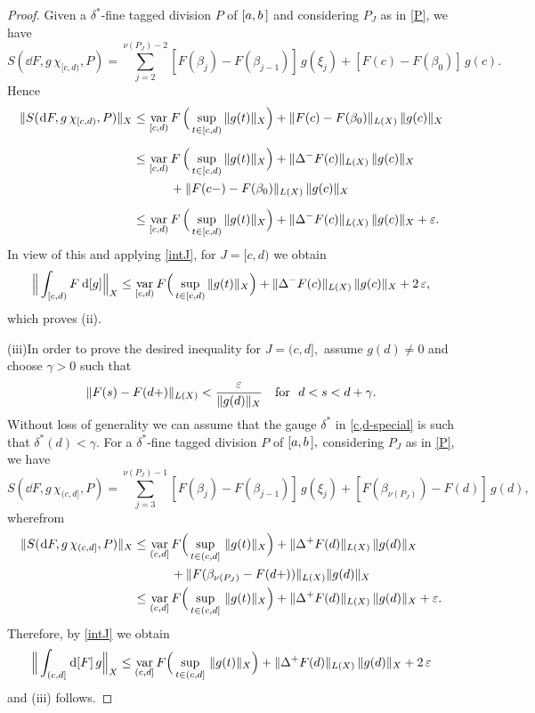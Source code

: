 \documentclass[12pt,twoside]{article}
\numberwithin{equation}{section}
\theoremstyle{plain}
\theoremstyle{definition}
\DeclareMathOperator{\var}{var}
\begin{document}
{\begin{proof}
Given a $\delta^*$-fine tagged division $P$ of $[a,b\,]$ and considering $P_J$ as in \eqref{P},
we have
\[
   S(\dd F,g\,\chi_{[c,d)},P)=\sum_{j=2}^{\nu(P_J)-2}
                       [F(\beta_j)-F(\beta_{j-1})]\,g(\xi_j)+[F(c)-F(\beta_0)]\,g(c).
\]
Hence
\begin{align*}
    \|S(\dd F,g\,\chi_{[c,d)},P)\|_X
    &\le\var_{[c,d)}F\,\Big(\sup_{t\in[c,d)}\|g(t)\|_X\Big)
                                                +\|F(c)-F(\beta_0)\|_{L(X)}\,\|g(c)\|_X
  \\[2mm]
	&\le\var_{[c,d)}F\,\Big(\sup_{t\in[c,d)}\|g(t)\|_X\Big)
                                                +\|\Delta^-F(c)\|_{L(X)}\,\|g(c)\|_X
  \\
	&\qquad\quad+\|F(c-)-F(\beta_0)\|_{L(X)}\,\|g(c)\|_X
  \\[2mm]
	&\le\var_{[c,d)}F\,\Big(\sup_{t\in [c,d)}\|g(t)\|_X\Big)
                                            +\|\Delta^-F(c)\|_{L(X)}\,\|g(c)\|_X+\eps.
\end{align*}
In view of this and applying \eqref{intJ}, for $J=[c,d)$ we obtain
\[
  \Big\|\int_{[c,d)}F\,\dd[g]\Big\|_X
  \le\var_{[c,d)}F\Big(\sup_{t\in[c,d)}\|g(t)\|_X\Big)
                                      +\|\Delta^-F(c)\|_{L(X)}\,\|g(c)\|_X+2\,\eps,
\]
which proves (ii).

\skipaline

\noindent
(iii)\quad In order to prove the desired inequality for $J=(c,d],$ assume $g(d)\ne 0$
and choose $\gamma>0$ such that
\[
   \|F(s)-F(d+)\|_{L(X)}<\frac{\varepsilon}{\|g(d)\|_X}\quad\mbox{for \ }d<s<d+\gamma.
\]
Without loss of generality we can assume that the gauge $\delta^*$ in \eqref{c,d-special}
is such that $\delta^*(d)<\gamma.$  For a $\delta^*$-fine tagged division $P$ of $[a,b\,],$
considering $P_J$ as in \eqref{P}, we have
\[
  S(\dd F,g\,\chi_{(c,d]},P)
  =\sum_{j=3}^{\nu(P_J)-1}
             [F(\beta_j)-F(\beta_{j-1})]\,g(\xi_j)+[F(\beta_{\nu(P_J)})-F(d)]\,g(d),
\]
wherefrom
\begin{align*}
   \|S(\dd F,g\,\chi_{(c,d]},P)\|_X
   &\le\var_{(c,d]}F\Big(\sup_{t\in(c,d]}\,\|g(t)\|_X\Big)+\|\Delta^
                                                          +F(d)\|_{L(X)}\,\|g(d)\|_X
 \\
   &\qquad\quad+\|F(\beta_{\nu(P_J)}-F(d+))\|_{L(X)}\|g(d)\|_X
 \\
   &\le\var_{(c,d]}F\Big(\sup_{t\in(c,d]}\,\|g(t)\|_X\Big)
                                           +\|\Delta^+F(d)\|_{L(X)}\,\|g(d)\|_X+\eps.
\end{align*}
Therefore, by \eqref{intJ} we obtain
\[
  \Big\|\int_{(c,d]}\dd[F]\,g\Big\|_X\le
  \var_{(c,d]}F\Big(\sup_{t\in(c,d]}\,\|g(t)\|_X\Big)+\|\Delta^+F(d)\|_{L(X)}\,\|g(d)\|_X+2\,\eps
\]
and (iii) follows.


\end{proof}}
\end{document}
